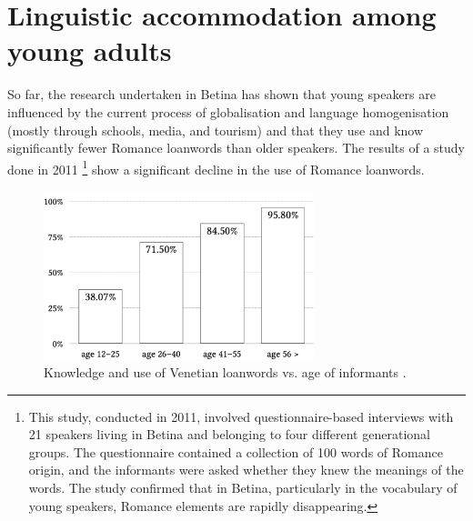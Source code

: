 \documentclass[output=paper]{LSP/langsci}
\begin{document}
\section{Linguistic accommodation among young adults}

So far, the research undertaken in Betina has shown that young speakers are influenced by the current process of globalisation and language homogenisation (mostly through schools, media, and tourism) and that they use and know significantly fewer Romance loanwords than older speakers. The results of a study done in 2011 \citep{skevin_izmedu_2012}\footnote{This study, conducted in 2011, involved questionnaire-based interviews with 21 speakers living in Betina and belonging to four different generational groups. The questionnaire contained a collection of 100 words of Romance origin, and the informants were asked whether they knew the meanings of the words. The study confirmed that in Betina, particularly in the vocabulary of young speakers, Romance elements are rapidly disappearing.} show a significant decline in the use of Romance loanwords. 
  
\begin{figure} 
\includegraphics[width=0.7\textwidth]{illustrations/skevin_fig1.pdf}
\caption{Knowledge and use of Venetian loanwords vs. age of informants \citep[175]{skevin_izmedu_2012}.}
\label{fig:1}
\end{figure} 
\end{document}

